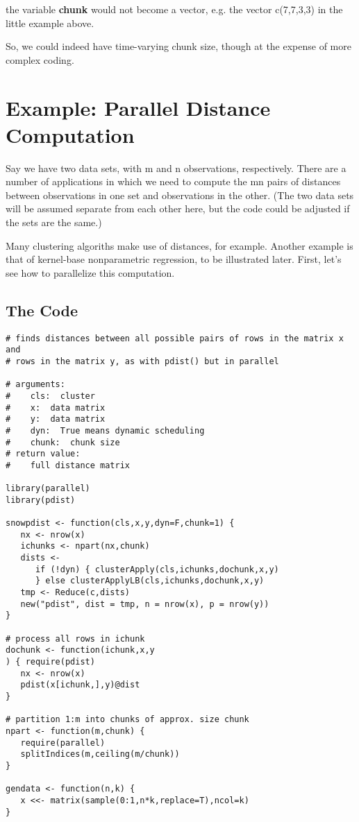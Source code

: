 the variable {\bf chunk} would not become a vector, e.g. the vector
c(7,7,3,3) in the little example above.

So, we could indeed have time-varying chunk size, though at the expense
of more complex coding.

\section{Example:  Parallel Distance Computation}

Say we have two data sets, with m and n observations, respectively.
There are a number of applications in which we need to compute the mn
pairs of distances between observations in one set and observations in
the other.  (The two data sets will be assumed separate from each other
here, but the code could be adjusted if the sets are the same.)

Many clustering algoriths make use of distances, for example.  Another
example is that of kernel-base nonparametric regression, to be
illustrated later.  First, let's see how to parallelize this
computation.

\subsection{The Code}

\begin{lstlisting}
# finds distances between all possible pairs of rows in the matrix x and
# rows in the matrix y, as with pdist() but in parallel

# arguments:
#    cls:  cluster
#    x:  data matrix 
#    y:  data matrix 
#    dyn:  True means dynamic scheduling
#    chunk:  chunk size 
# return value:
#    full distance matrix

library(parallel)
library(pdist)

snowpdist <- function(cls,x,y,dyn=F,chunk=1) {
   nx <- nrow(x)
   ichunks <- npart(nx,chunk)
   dists <- 
      if (!dyn) { clusterApply(cls,ichunks,dochunk,x,y) 
      } else clusterApplyLB(cls,ichunks,dochunk,x,y) 
   tmp <- Reduce(c,dists)
   new("pdist", dist = tmp, n = nrow(x), p = nrow(y))
}

# process all rows in ichunk 
dochunk <- function(ichunk,x,y
) { require(pdist)
   nx <- nrow(x)
   pdist(x[ichunk,],y)@dist
}

# partition 1:m into chunks of approx. size chunk
npart <- function(m,chunk) {
   require(parallel)
   splitIndices(m,ceiling(m/chunk))
}

gendata <- function(n,k) {
   x <<- matrix(sample(0:1,n*k,replace=T),ncol=k)
}
\end{lstlisting}


